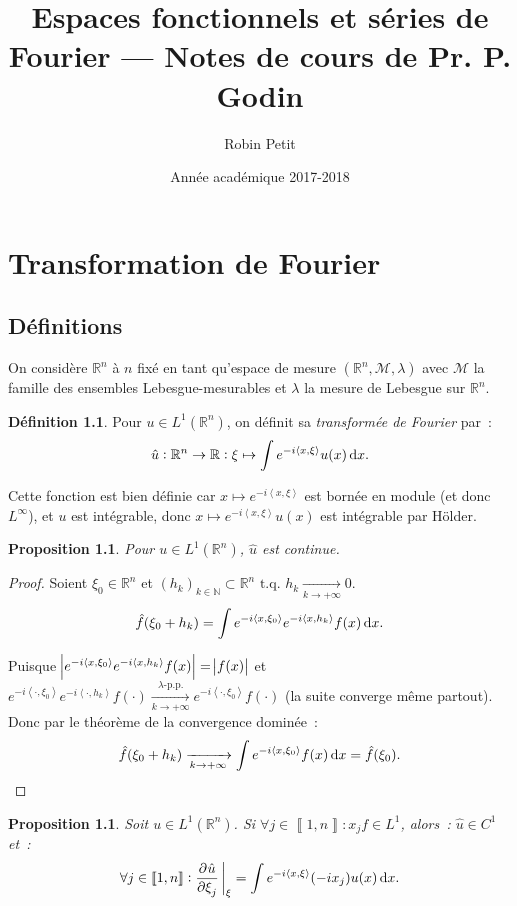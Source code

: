 \documentclass{report}
\title{Espaces fonctionnels et séries de Fourier --- Notes de cours de Pr. P. Godin}
\author{Robin Petit}
\date{Année académique 2017-2018}
\newcommand{\R}{{\mathbb R}}
\newcommand{\N}{{\mathbb N}}
\newcommand{\scpr}[2]{\left\langle#1, #2\right\rangle}
\newcommand{\tq}{\text{ t.q. }}
\newcommand{\pinfty}{{+\infty}}
\newcommand{\intint}[2]{{\left\llbracket#1, #2\right\rrbracket}}
\newtheorem{prp}[thm]{Proposition}
\theoremstyle{definition}
\newtheorem{déf}[thm]{Définition}
\theoremstyle{remark}
\begin{document}
\maketitle
\tableofcontents
\setcounter{page}{1}

\chapter{Transformation de Fourier}

\section{Définitions}

On considère $\R^n$ à $n$ fixé en tant qu'espace de mesure $(\R^n, \mathcal M, \lambda)$ avec $\mathcal M$ la famille des ensembles Lebesgue-mesurables et $\lambda$
la mesure de Lebesgue sur $\R^n$.

\begin{déf} Pour $u \in L^1(\R^n)$, on définit sa \textit{transformée de Fourier} par~:
\begin{equation}
	\hat u : \R^n \to \R : \xi \mapsto \int e^{-i\scpr x\xi}u(x)\dif x.
\end{equation}
\end{déf}

Cette fonction est bien définie car $x \mapsto e^{-i\scpr x\xi}$ est bornée en module (et donc $L^\infty$), et $u$ est intégrable, donc $x \mapsto e^{-i\scpr x\xi}u(x)$ est intégrable
par Hölder.

\begin{prp} Pour $u \in L^1(\R^n)$, $\hat u$ est continue.
\end{prp}

\begin{proof} Soient $\xi_0 \in \R^n$ et $(h_k)_{k \in \N} \subset \R^n \tq h_k \xrightarrow[k \to \pinfty]{} 0$.
\[\hat f(\xi_0 + h_k) = \int e^{-i\scpr x{\xi_0}}e^{-i\scpr x{h_k}}f(x)\dif x.\]

Puisque $\abs {e^{-i\scpr x{\xi_0}}e^{-i\scpr x{h_k}}f(x)} = \abs {f(x)}$ et
$e^{-i\scpr \cdot{\xi_0}}e^{-i\scpr \cdot{h_k}}f(\cdot) \xrightarrow[k \to \pinfty]{\lambda\text{-p.p.}}e^{-i\scpr \cdot{\xi_0}}f(\cdot)$ (la suite converge même partout). Donc
par le théorème de la convergence dominée~:
\[\hat f(\xi_0 + h_k) \xrightarrow[k \to \pinfty]{} \int e^{-i\scpr x{\xi_0}}f(x)\dif x = \hat f(\xi_0).\]
\end{proof}

\begin{prp} Soit $u \in L^1(\R^n)$. Si $\forall j \in \intint 1n : x_jf \in L^1$, alors~: $\hat u \in C^1$ et~:
\begin{equation}\label{eq:pd transformée Fourier}
	\forall j \in \intint 1n : \dpd {\hat u}{\xi_j}\sVert[3]_\xi = \int e^{-i\scpr x\xi}(-ix_j)u(x)\dif x.
\end{equation}
\end{prp}
\end{document}
